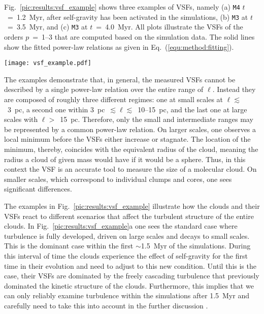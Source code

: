 Fig.~\ref{pic:results:vsf_example} shows three examples of VSFs, namely (a) \texttt{M4} $t$~=~1.2~Myr, after self-gravity has been activated in the simulations, (b) \texttt{M3} at $t$~=~3.5~Myr, and (c) \texttt{M3} at $t$~=~4.0~Myr.
All plots illustrate the VSFs of the orders $p$~=~1--3 that are computed based on the simulation data.
The solid lines show the fitted power-law relations as given in Eq.~(\ref{equ:method:fitting}).

\begin{figure*}[!htb]
	\centering
	\texttt{[image: vsf\_example.pdf]}
    \caption{Examples of velocity structure functions as function of the lag scale, $\ell$, and order, $p$. 
    	The dots (connected by dashed lines) illustrate the measured values based on the simulation data. 
        The solid lines represent the power-law relations fitted to the respective structure function.
	}
    \label{pic:results:vsf_example}
\end{figure*}

The examples demonstrate that, in general, the measured VSFs cannot be described by a single power-law relation over the entire range of $\ell$.
Instead they are composed of roughly three different regimes: 
one at small scales at $\ell \lesssim$~3~pc, a second one within 3~pc~$\lesssim \ell \lesssim$~10--15~pc, and the last one at large scales with $\ell >$~15~pc.
Therefore, only the small and intermediate ranges may be represented by a common power-law relation.
On larger scales, one observes a local minimum before the VSFs either increase or stagnate.
The location of the minimum, thereby, coincides with the equivalent radius of the cloud, meaning the radius a cloud of given mass would have if it would be a sphere.
Thus, in this context the VSF is an accurate tool to measure the size of a molecular cloud.
On smaller scales, which correspond to individual clumps and cores, one sees significant differences.

The examples in Fig.~\ref{pic:results:vsf_example} illustrate how the clouds and their VSFs react to different scenarios that affect the turbulent structure of the entire clouds. 
In Fig.~\ref{pic:results:vsf_example}a one sees the standard case where turbulence is fully developed, driven on large scales and decays to small scales.
This is the dominant case within the first $\sim$1.5~Myr of the simulations.
During this interval of time the clouds experience the effect of self-gravity for the first time in their evolution and need to adjust to this new condition.
Until this is the case, their VSFs are dominated by the freely cascading turbulence that previously dominated the kinetic structure of the clouds.
Furthermore, this implies that we can only reliably examine turbulence within the simulations after 1.5~Myr and carefully need to take this into account in the further discussion \citep[see][]{IbanezMejia2017,Seifried2017b}.

